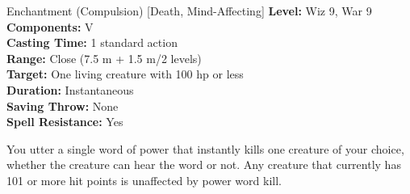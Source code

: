 {Enchantment (Compulsion) [Death, Mind-Affecting]}
{
	\textbf{Level:}
	Wiz 9, War 9\\
	\textbf{Components:}
	V\\
	\textbf{Casting Time:}
	1 standard action\\
	\textbf{Range:}
	Close (7.5 m + 1.5 m/2 levels)\\
	\textbf{Target:}
	One living creature with 100 hp or less\\
	\textbf{Duration:}
	Instantaneous\\
	\textbf{Saving Throw:}
	None\\
	\textbf{Spell Resistance:}
	Yes\\
}
{
	You utter a single word of power that instantly kills one creature of your choice, whether the creature can hear the word or not. Any creature that currently has 101 or more hit points is unaffected by power word kill.

}

